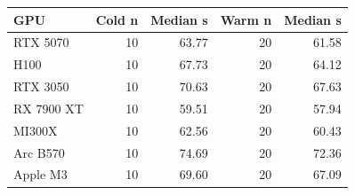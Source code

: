 \begin{tabular}{lrrrr}
\toprule
GPU & Cold n & Median s & Warm n & Median s \\
\midrule
RTX 5070 & 10 & 63.77 & 20 & 61.58 \\
H100 & 10 & 67.73 & 20 & 64.12 \\
RTX 3050 & 10 & 70.63 & 20 & 67.63 \\
RX 7900 XT & 10 & 59.51 & 20 & 57.94 \\
MI300X & 10 & 62.56 & 20 & 60.43 \\
Arc B570 & 10 & 74.69 & 20 & 72.36 \\
Apple M3 & 10 & 69.60 & 20 & 67.09 \\
\bottomrule
\end{tabular}
